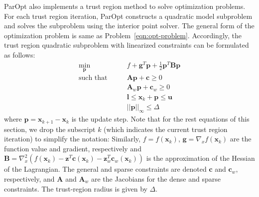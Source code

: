 \documentclass[12pt]{article}
\newcommand{\mb}{\mathbf}
\begin{document}
ParOpt also implements a trust region method to solve optimization problems.
For each trust region iteration, ParOpt constructs a quadratic model subproblem and solves the subproblem using the interior point solver.
The general form of the optimization problem is same as Problem~\eqref{eqn:opt-problem}.
Accordingly, the trust region quadratic subproblem with linearized constraints can be formulated as follows:
%
\begin{equation}
  \label{eqn:quad-problem}
  \begin{aligned}
    \min_{\mb{p}} \qquad & f + \mb{g}^T\mb{p} + \frac{1}{2}\mb{p}^T\mb{B}\mb{p} \\
    \text{such that} \qquad
    & \mb{A}\mb{p} + \mb{c} \ge 0 \\
    & \mb{A}_{w}\mb{p} + \mb{c}_{w} \ge 0 \\
    & \mb{l} \le \mb{x}_k + \mb{p} \le \mb{u} \\
    & ||\mb{p}||_\infty \le \Delta
  \end{aligned}
\end{equation}
%
where $\mb{p} = \mb{x}_{k+1} - \mb{x}_{k}$ is the update step.
Note that for the rest equations of this section, we drop the subscript $k$ (which indicates the current trust region iteration) to simplify the notation:
Similarly, $f = f(\mb{x}_k)$, $\mb{g} = \nabla_x f(\mb{x}_k)$ are the function value and gradient, respectively and $\mb{B} = \nabla_x^2 (f(\mb{x}_k) - \mb{z}^T \mb{c}(\mb{x}_k)-\mb{z}_w^T \mb{c}_w(\mb{x}_k))$ is the approximation of the Hessian of the Lagrangian.
The general and sparse constraints are denoted $\mb{c}$ and $\mb{c}_{w}$, respectively, and $\mb{A}$ and $\mb{A}_w$ are the Jacobians for the dense and sparse constraints.
The trust-region radius is given by $\Delta$.
\end{document}
